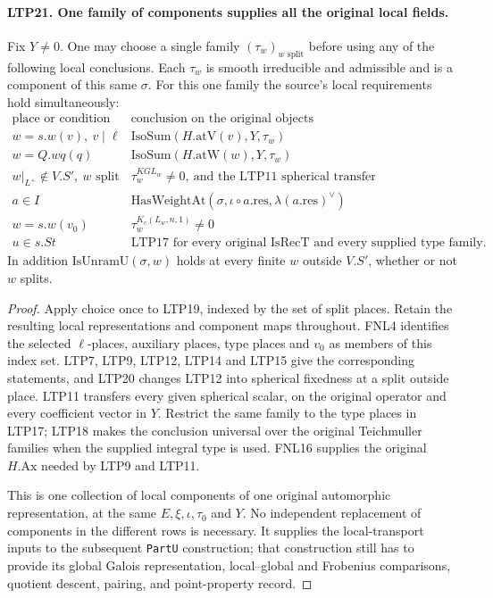 \paragraph{LTP21. One family of components supplies all the original local fields.}
\label{claim:LTP21}
Fix \(Y\ne0\).  One may choose a single family
\((\tau_w)_{w\text{ split}}\) before using any of the following
local conclusions.  Each \(\tau_w\) is smooth irreducible and
admissible and is a component of this same \(\sigma\).  For this
one family the source's local requirements hold simultaneously:
\[
\begin{array}{c|l}
 \text{place or condition}&\text{conclusion on the original objects}\\ \hline
 w=s.w(v),\ v\mid\ell&\mathrm{IsoSum}(H.\mathrm{atV}(v),Y,\tau_w)\\
 w=Q.wq(q)&\mathrm{IsoSum}(H.\mathrm{atW}(w),Y,\tau_w)\\
 w|_{L^+}\notin V.S',\ w\text{ split}
       &\tau_w^{KGL_w}\ne0,\ \text{and the LTP11 spherical transfer}\\
 a\in I&\mathrm{HasWeightAt}(\sigma,\iota\circ a.\mathrm{res},
                                               \lambda(a.\mathrm{res})^\vee)\\
 w=s.w(v_0)&\tau_w^{K_c(L_w,n,1)}\ne0\\
 u\in s.St&\text{LTP17 for every original }\mathrm{IsRecT}
                 \text{ and every supplied type family.}
\end{array}
\]
In addition \(\mathrm{IsUnramU}(\sigma,w)\) holds at every
finite \(w\) outside \(V.S'\), whether or not \(w\) splits.
\begin{proof}
Apply choice once to LTP19, indexed by the set of split places.
Retain the resulting local representations and component maps
throughout.  FNL4 identifies the selected \(\ell\)-places,
auxiliary places, type places and \(v_0\) as members of this
index set.  LTP7, LTP9, LTP12, LTP14 and LTP15 give the
corresponding statements, and LTP20 changes LTP12 into spherical
fixedness at a split outside place.  LTP11 transfers every
given spherical scalar, on the original operator and every
coefficient vector in \(Y\).  Restrict the same family to the
type places in LTP17; LTP18 makes the conclusion universal over
the original Teichmuller families when the supplied integral
type is used.  FNL16 supplies the original \(H.\mathrm{Ax}\)
needed by LTP9 and LTP11.

This is one collection of local components of one original
automorphic representation, at the same \(E,\xi,\iota,\tau_0\)
and \(Y\).  No independent replacement of components in the
different rows is necessary.  It supplies the local-transport
inputs to the subsequent \texttt{PartU} construction; that
construction still has to provide its global Galois representation,
local--global and Frobenius comparisons, quotient descent,
pairing, and point-property record.
\end{proof}
